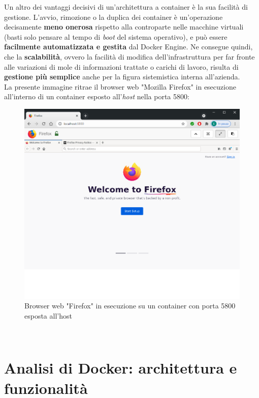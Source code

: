 Un altro dei vantaggi decisivi di un'architettura a container è la sua facilità di gestione. L'avvio, rimozione o la duplica dei container è un'operazione decisamente \textbf{meno onerosa} rispetto alla controparte nelle macchine virtuali (basti solo pensare al tempo di \textit{\gls{boot}} del sistema operativo), e può essere \textbf{facilmente automatizzata e gestita} dal Docker Engine. Ne consegue quindi, che la \textbf{scalabilità}, ovvero la facilità di modifica dell'infrastruttura per far fronte alle variazioni di mole di informazioni trattate o carichi di lavoro, risulta di \textbf{gestione più semplice} anche per la figura sistemistica interna all'azienda.
\\
La presente immagine ritrae il browser web "Mozilla Firefox" in esecuzione all'interno di un container esposto all'\textit{host} nella porta 5800:
\begin{figure}[!h]     
\centering 
    \includegraphics[width=0.6\columnwidth]{immagini/screenshot/firefox_container} 
    \caption{Browser web "Firefox" in esecuzione su un container con porta 5800 esposta all'host}
\end{figure} \\
\newpage
\section{Analisi di Docker: architettura e funzionalità}

